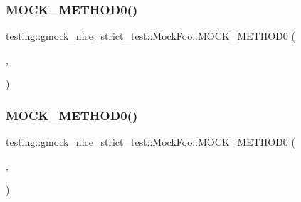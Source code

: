 \subsubsection{\texorpdfstring{MOCK\_METHOD0()}{MOCK\_METHOD0()}\hspace{0.1cm}{\footnotesize\ttfamily [5/6]}}
{\footnotesize\ttfamily testing\+::gmock\+\_\+nice\+\_\+strict\+\_\+test\+::\+Mock\+Foo\+::\+M\+O\+C\+K\+\_\+\+M\+E\+T\+H\+O\+D0 (\begin{DoxyParamCaption}\item[{Return\+Non\+Default\+Constructible}]{,  }\item[{\mbox{\hyperlink{classtesting_1_1gmock__nice__strict__test_1_1_not_default_constructible}{Not\+Default\+Constructible}}()}]{ }\end{DoxyParamCaption})}

\mbox{\label{classtesting_1_1gmock__nice__strict__test_1_1_mock_foo_a2d69a27a8789f04938cb1eb0047bb677}} 
\subsubsection{\texorpdfstring{MOCK\_METHOD0()}{MOCK\_METHOD0()}\hspace{0.1cm}{\footnotesize\ttfamily [6/6]}}
{\footnotesize\ttfamily testing\+::gmock\+\_\+nice\+\_\+strict\+\_\+test\+::\+Mock\+Foo\+::\+M\+O\+C\+K\+\_\+\+M\+E\+T\+H\+O\+D0 (\begin{DoxyParamCaption}\item[{Return\+Non\+Default\+Constructible}]{,  }\item[{\mbox{\hyperlink{classtesting_1_1gmock__nice__strict__test_1_1_not_default_constructible}{Not\+Default\+Constructible}}()}]{ }\end{DoxyParamCaption})}

\mbox{\label{classtesting_1_1gmock__nice__strict__test_1_1_mock_foo_a3a7bfcf303a2c8578db900c9525b02a1}} 
